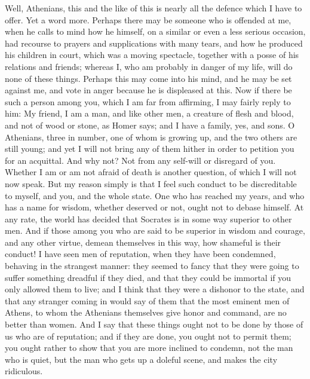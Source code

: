 Well, Athenians, this and the like of this is nearly all the defence
which I have to offer. Yet a word more. Perhaps there may be someone
who is offended at me, when he calls to mind how he himself, on a
similar or even a less serious occasion, had recourse to prayers and
supplications with many tears, and how he produced his children in
court, which was a moving spectacle, together with a posse of his
relations and friends; whereas I, who am probably in danger of my
life, will do none of these things. Perhaps this may come into his
mind, and he may be set against me, and vote in anger because he is
displeased at this. Now if there be such a person among you, which
I am far from affirming, I may fairly reply to him: My friend, I am
a man, and like other men, a creature of flesh and blood, and not
of wood or stone, as Homer says; and I have a family, yes, and sons.
O Athenians, three in number, one of whom is growing up, and the two
others are still young; and yet I will not bring any of them hither
in order to petition you for an acquittal. And why not? Not from any
self-will or disregard of you. Whether I am or am not afraid of death
is another question, of which I will not now speak. But my reason
simply is that I feel such conduct to be discreditable to myself,
and you, and the whole state. One who has reached my years, and who
has a name for wisdom, whether deserved or not, ought not to debase
himself. At any rate, the world has decided that Socrates is in some
way superior to other men. And if those among you who are said to
be superior in wisdom and courage, and any other virtue, demean themselves
in this way, how shameful is their conduct! I have seen men of reputation,
when they have been condemned, behaving in the strangest manner: they
seemed to fancy that they were going to suffer something dreadful
if they died, and that they could be immortal if you only allowed
them to live; and I think that they were a dishonor to the state,
and that any stranger coming in would say of them that the most eminent
men of Athens, to whom the Athenians themselves give honor and command,
are no better than women. And I say that these things ought not to
be done by those of us who are of reputation; and if they are done,
you ought not to permit them; you ought rather to show that you are
more inclined to condemn, not the man who is quiet, but the man who
gets up a doleful scene, and makes the city ridiculous. 

